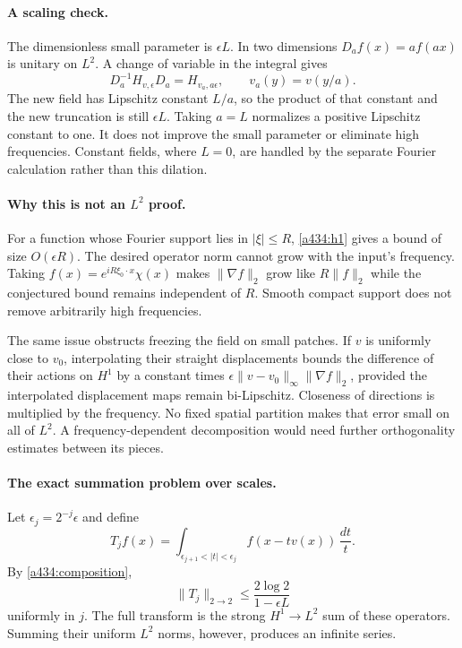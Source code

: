 \documentclass[11pt]{article}
\begin{document}
\paragraph{A scaling check.}
The dimensionless small parameter is $\epsilon L$.
In two dimensions $D_af(x)=a f(ax)$ is unitary on $L^2$.
A change of variable in the integral gives
\[
 D_a^{-1}H_{v,\epsilon}D_a
       =H_{v_a,a\epsilon},\qquad v_a(y)=v(y/a).
\]
The new field has Lipschitz constant $L/a$, so the product
of that constant and the new truncation is still
$\epsilon L$. Taking $a=L$ normalizes a positive
Lipschitz constant to one. It does not improve the
small parameter or eliminate high frequencies.
Constant fields, where $L=0$, are handled by the
separate Fourier calculation rather than this dilation.

\paragraph{Why this is not an $L^2$ proof.}
For a function whose Fourier support lies in $|\xi|\leq R$,
\eqref{a434:h1} gives a bound of size $O(\epsilon R)$.
The desired operator norm cannot grow with the input's
frequency. Taking $f(x)=e^{iR\xi_0\cdot x}\chi(x)$ makes
$\|\nabla f\|_2$ grow like $R\|f\|_2$ while the conjectured
bound remains independent of $R$. Smooth compact support
does not remove arbitrarily high frequencies.

The same issue obstructs freezing the field on small patches.
If $v$ is uniformly close to $v_0$, interpolating their
straight displacements bounds the difference of their
actions on $H^1$ by a constant times
$\epsilon\|v-v_0\|_\infty\|\nabla f\|_2$, provided the
interpolated displacement maps remain bi-Lipschitz.
Closeness of directions is multiplied by the frequency.
No fixed spatial partition makes that error small on
all of $L^2$. A frequency-dependent decomposition would
need further orthogonality estimates between its pieces.

\paragraph{The exact summation problem over scales.}
Let $\epsilon_j=2^{-j}\epsilon$ and define
\[
 T_jf(x)=\int_{\epsilon_{j+1}<|t|<\epsilon_j}
                            f(x-tv(x))\,\frac{dt}{t}.
\]
By \eqref{a434:composition},
\[
 \|T_j\|_{2\to2}\leq
                 \frac{2\log2}{1-\epsilon L}
\]
uniformly in $j$. The full transform is the strong
$H^1\to L^2$ sum of these operators. Summing their uniform
$L^2$ norms, however, produces an infinite series.
\end{document}
